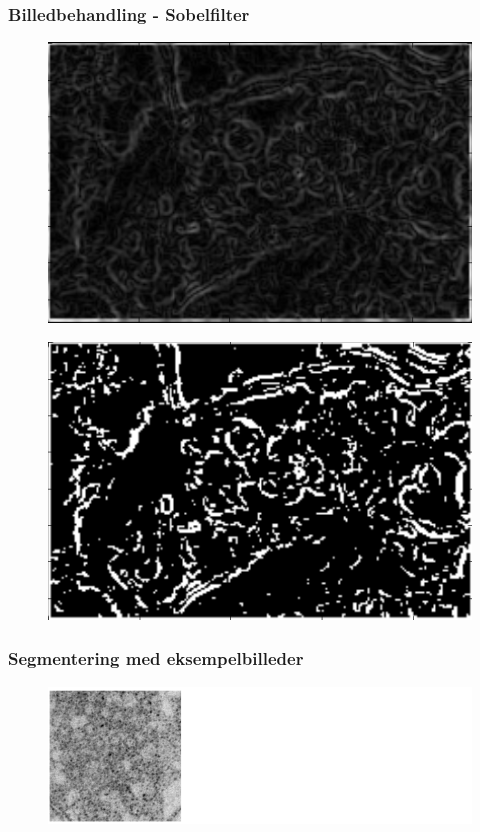 \documentclass[12pt,t]{beamer}
\begin{document}
\begin{frame}
\frametitle{Billedbehandling - Sobelfilter}
\begin{figure}[H]
	\centering
	\includegraphics[scale=0.4]{../files/premethod/img/sobel3.png}
\end{figure}
\begin{figure}[H]
	\centering
	\includegraphics[scale=0.4]{../files/premethod/img/edgemap2.png}
\end{figure}
\end{frame}


\begin{frame}
\frametitle{Segmentering med eksempelbilleder}
\begin{figure}[H]
\includegraphics[scale=0.35]{img/afstand/3.png}
\end{figure}
\end{frame}
\end{document}
